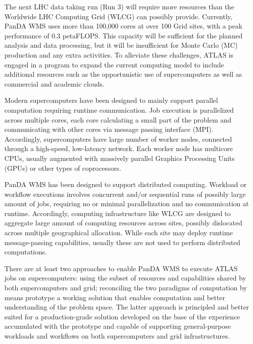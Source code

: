 The next LHC data taking run (Run 3) will require more resources than the
Worldwide LHC Computing Grid (WLCG) can possibly provide. Currently, PanDA WMS
uses more than 100,000 cores at over 100 Grid sites, with a peak performance of
0.3 petaFLOPS. This capacity will be sufficient for the planned analysis and
data processing, but it will be insufficient for Monte Carlo (MC) production and
any extra activities. To alleviate these challenges, ATLAS is engaged in a
program to expand the current computing model to include additional resources
such as the opportunistic use of supercomputers as well as commercial and
academic clouds.


Modern supercomputers have been designed to mainly support parallel computation
requiring runtime communication. Job execution is parallelized across multiple
cores, each core calculating a small part of the problem and communicating with
other cores via message passing interface (MPI). Accordingly, supercomputers
have large number of worker nodes, connected through a high-speed, low-latency
network. Each worker node has multicore CPUs, usually augmented with massively
parallel Graphics Processing Units (GPUs) or other types of coprocessors.

PanDA WMS has been designed to support distributed computing. Workload or
workflow executions involves concurrent and/or sequential runs of possibly large
amount of jobs, requiring no or minimal parallelization and no communication at
runtime. Accordingly, computing infrastructure like WLCG are designed to
aggregate large amount of computing resources across sites, possibly dislocated
across multiple geographical allocation. While each site may deploy runtime
message-passing capabilities, usually these are not used to perform distributed
computations.

There are at least two approaches to enable PanDA WMS to execute ATLAS jobs on
supercomputers: using the subset of resources and capabilities shared by both
supercomputers and grid; reconciling the two paradigms of computation by means
prototype a working solution that enables computation and better understanding
of the problem space. The latter approach is principled and better suited for a
production-grade solution developed on the base of the experience accumulated
with the prototype and capable of supporting general-purpose workloads and
workflows on both supercomputers and grid infrastructures.


